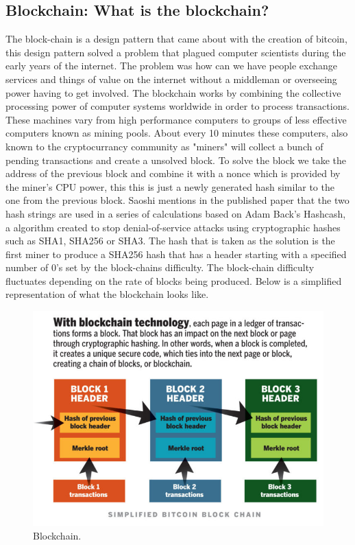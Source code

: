 \subsection{Blockchain: What is the blockchain?}
The block-chain is a design pattern that came about with the creation of bitcoin, this design pattern solved a problem that plagued computer scientists during the early years of the internet. The problem was how can we have people exchange services and things of value on the internet without a middleman or overseeing power having to get involved. The blockchain works by combining the collective processing power of computer systems worldwide in order to process transactions. These machines vary from high performance computers to groups of less effective computers known as mining pools. About every 10 minutes these computers, also known to the cryptocurrancy community as "miners" will collect a bunch of pending transactions and create a unsolved block. To solve the block we take the address of the previous block and combine it with a nonce which is provided by the miner’s CPU power, this this is just a newly generated hash similar to the one from the previous block. Saoshi mentions in the published paper that the two hash strings are used in a series of calculations based on Adam Back's Hashcash, a algorithm created to stop denial-of-service attacks using cryptographic hashes such as SHA1, SHA256 or SHA3. The hash that is taken as the solution is the first miner to produce a SHA256 hash that has a header starting with a specified number of 0’s set by the block-chains difficulty.  The block-chain difficulty fluctuates depending on the rate of blocks being produced. Below is a simplified representation of what the blockchain looks like.
\begin{figure}[H]
\centering
\includegraphics[scale=0.5]{img/blockchaindesign.jpg}
\caption{Blockchain.}
\end{figure}
